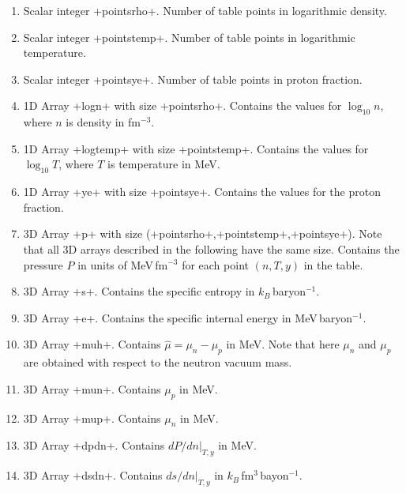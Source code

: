 \documentclass[letterpaper,11pt]{refart}
\begin{document}
\begin{enumerate}
 \item Scalar integer \verbprm+pointsrho+. Number of table points in
   logarithmic density.

 \item Scalar integer \verbprm+pointstemp+. Number of table points in
   logarithmic temperature.

 \item Scalar integer \verbprm+pointsye+. Number of table points in
   proton fraction.

 \item 1D Array
   \verbprm+logn+ with size \verbprm+pointsrho+. Contains the values for
   $\log_{10}n$, where $n$ is density in fm$^{-3}$.

 \item 1D Array \verbprm+logtemp+ with size
   \verbprm+pointstemp+. Contains the values for $\log_{10}T$, where
   $T$ is temperature in MeV.

 \item 1D Array \verbprm+ye+ with size \verbprm+pointsye+. Contains
   the values for the proton fraction.
   

 \item 3D Array \verbprm+p+ with size
   (\verbprm+pointsrho+,\verbprm+pointstemp+,\verbprm+pointsye+). Note
   that all 3D arrays described in the following have the same
   size. Contains the pressure $P$ in units of MeV\,fm$^{-3}$ for each
   point $(n,T,y)$ in the table.

 \item 3D Array \verbprm+s+. Contains the specific entropy in
   $k_B$\,baryon$^{-1}$.

 \item 3D Array \verbprm+e+. Contains the specific internal energy in
   MeV\,baryon$^{-1}$.

 \item 3D Array \verbprm+muh+. Contains $\hat\mu=\mu_n-\mu_p$ in MeV. 
   Note that here $\mu_n$ and $\mu_p$ are obtained with respect to the neutron vacuum mass. 
   
 \item 3D Array \verbprm+mun+. Contains $\mu_p$ in MeV. 

 \item 3D Array \verbprm+mup+. Contains $\mu_n$ in MeV.

 \item 3D Array \verbprm+dpdn+. Contains $dP/dn\vert_{T,y}$ in MeV.  

 \item 3D Array \verbprm+dsdn+. Contains $ds/dn\vert_{T,y}$ in $k_B$\,fm$^3$\,bayon$^{-1}$. 


\end{enumerate}
\end{document}
